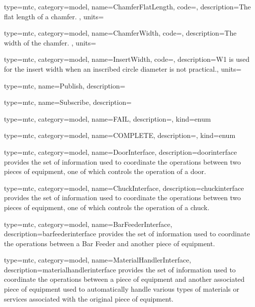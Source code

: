 {
  type=mtc,
  category=model,
  name={ChamferFlatLength},
  code=,
  description={The flat length of a chamfer. },
  units=
}


{
  type=mtc,
  category=model,
  name={ChamferWidth},
  code=,
  description={The width of the chamfer. },
  units=
}


{
  type=mtc,
  category=model,
  name={InsertWidth},
  code=,
  description={W1 is used for the insert width when an inscribed circle diameter is not practical.},
  units=
}


{
  type=mtc,
  name={Publish},
  description={}
}


{
  type=mtc,
  name={Subscribe},
  description={}
}



{
  type=mtc,
  category=model,
  name={FAIL},
  description={},
  kind={enum}
}


{
  type=mtc,
  category=model,
  name={COMPLETE},
  description={},
  kind={enum}
}


{
  type=mtc,
  category=model,
  name={DoorInterface},
  description={\gls{doorinterface} provides the set of information used to coordinate the operations between two pieces of equipment, one of which controls the operation of a door. }
}


{
  type=mtc,
  category=model,
  name={ChuckInterface},
  description={\gls{chuckinterface} provides the set of information used to coordinate the operations between two pieces of equipment, one of which controls the operation of a chuck.  }
}


{
  type=mtc,
  category=model,
  name={BarFeederInterface},
  description={\gls{barfeederinterface} provides the set of information used to coordinate the operations between a Bar Feeder and another piece of equipment.  }
}


{
  type=mtc,
  category=model,
  name={MaterialHandlerInterface},
  description={\gls{materialhandlerinterface} provides the set of information used to coordinate the operations between a piece of equipment and another associated piece of equipment used to automatically handle various types of materials or services associated with the original piece of equipment. }
}


